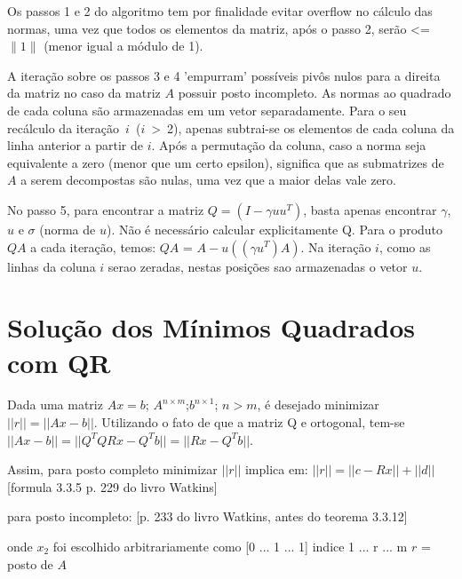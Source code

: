 Os passos 1 e 2 do algoritmo tem por finalidade evitar overflow no cálculo
das normas, uma vez que todos os elementos da matriz, após o passo 2, 
serão <= $\|1\|$ (menor igual a módulo de 1).

A iteração sobre os passos 3 e 4 'empurram' possíveis pivôs nulos para a direita 
da matriz no caso da matriz $A$ possuir posto incompleto. 
As normas ao quadrado de cada coluna são armazenadas em um vetor separadamente. Para
o seu recálculo da iteração~$i$~($i$~>~2), apenas subtrai-se os elementos de cada coluna da 
linha anterior a partir de $i$. Após a permutação da coluna, caso a norma seja equivalente
a zero (menor que um certo epsilon), significa que as submatrizes de $A$ a serem decompostas 
são nulas, uma vez que a maior delas vale zero.

No passo 5, para encontrar a matriz $Q = (I - \gamma uu^T)$, basta apenas encontrar
$\gamma$, $u$ e $\sigma$ (norma de $u$). Não é necessário calcular explicitamente Q. 
Para o produto $QA$ a cada iteração, temos: $QA$ = $A - u  ((\gamma  u^T)  A)$.
Na iteração $i$, como as linhas da coluna $i$ serao zeradas, nestas posições sao armazenadas
o vetor $u$.

\section{Solução dos Mínimos Quadrados com QR}
Dada uma matriz $Ax = b$; $A^{n \times m}$;$ b^{n \times 1}$; $n > m$,
é desejado minimizar  $||r|| = || Ax - b ||$.  Utilizando o fato
de que a matriz Q e ortogonal, tem-se  $|| Ax - b || = || Q^T QRx - Q^Tb || = || Rx - Q^Tb ||$.

Assim, para posto completo minimizar $||r||$ implica em:
$||r|| =  ||c - Rx|| + ||d||$
[formula 3.3.5 p. 229 do livro Watkins]


para posto incompleto:
[p. 233 do livro Watkins, antes do teorema 3.3.12]


onde $x_2$ foi escolhido arbitrariamente como [0 ... 1 ... 1]
                                     indice 1 ... r ... m
				     $r$ = posto de $A$